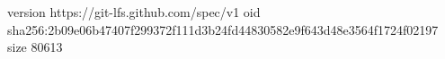 version https://git-lfs.github.com/spec/v1
oid sha256:2b09e06b47407f299372f111d3b24fd44830582e9f643d48e3564f1724f02197
size 80613
